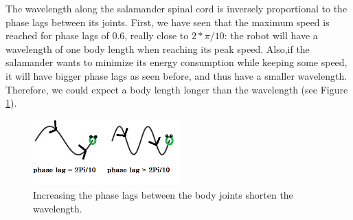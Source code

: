 \documentclass{cmc}
\begin{document}
The wavelength along the salamander spinal cord is inversely proportional to the phase lags between its joints. First, we have seen that the maximum speed is reached for phase lags of 0.6, really close to $2*\pi/10$: the robot will have a wavelength of one body length when reaching its peak speed. Also,if the salamander wants to minimize its energy consumption while keeping some speed, it will have bigger phase lags as seen before, and thus have a smaller wavelength. Therefore, we could expect a body length longer than the wavelength (see Figure \ref{fig:wave}).
\begin{figure}[h]
  \centering
  \includegraphics[width=0.5\textwidth]{sinewave.PNG}
  \caption{Increasing the phase lags between the body joints shorten the wavelength.}
  \label{fig:wave}
\end{figure}


\end{document}
